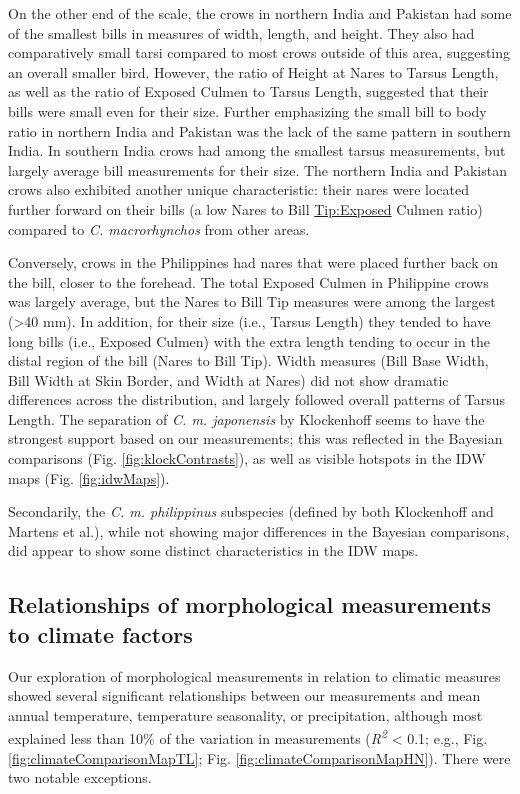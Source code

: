 \documentclass[10pt,a4paper]{article}
\begin{document}
On the other end of the scale, the crows in northern India and Pakistan had some of the smallest bills in measures of width, length, and height.
They also had comparatively small tarsi compared to most crows outside of this area, suggesting an overall smaller bird.
However, the ratio of Height at Nares to Tarsus Length, as well as the ratio of Exposed Culmen to Tarsus Length, suggested that their bills were small even for their size.
Further emphasizing the small bill to body ratio in northern India and Pakistan was the lack of the same pattern in southern India.
In southern India crows had among the smallest tarsus measurements, but largely average bill measurements for their size.
The northern India and Pakistan crows also exhibited another unique characteristic: their nares were located further forward on their bills (a low Nares to Bill \url{Tip:Exposed} Culmen ratio) compared to \emph{C. macrorhynchos} from other areas.

Conversely, crows in the Philippines had nares that were placed further back on the bill, closer to the forehead.
The total Exposed Culmen in Philippine crows was largely average, but the Nares to Bill Tip measures were among the largest (\textgreater40 mm).
In addition, for their size (i.e., Tarsus Length) they tended to have long bills (i.e., Exposed Culmen) with the extra length tending to occur in the distal region of the bill (Nares to Bill Tip).
Width measures (Bill Base Width, Bill Width at Skin Border, and Width at Nares) did not show dramatic differences across the distribution, and largely followed overall patterns of Tarsus Length.
The separation of \emph{C. m. japonensis} by Klockenhoff seems to have the strongest support based on our measurements; this was reflected in the Bayesian comparisons (Fig. \ref{fig:klockContrasts}), as well as visible hotspots in the IDW maps (Fig. \ref{fig:idwMaps}).

Secondarily, the \emph{C. m. philippinus} subspecies (defined by both Klockenhoff and Martens et al.), while not showing major differences in the Bayesian comparisons, did appear to show some distinct characteristics in the IDW maps.

\subsection{Relationships of morphological measurements to climate factors}\label{relationships-of-morphological-measurements-to-climate-factors}

Our exploration of morphological measurements in relation to climatic measures showed several significant relationships between our measurements and mean annual temperature, temperature seasonality, or precipitation, although most explained less than 10\% of the variation in measurements (\emph{R\textsuperscript{2}} \textless{} 0.1; e.g., Fig. \ref{fig:climateComparisonMapTL}; Fig. \ref{fig:climateComparisonMapHN}).
There were two notable exceptions.
\end{document}
